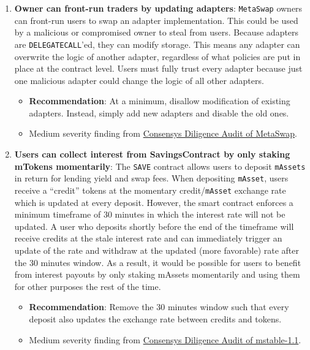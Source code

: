\begin{enumerate}
\item\textbf{Owner can front-run traders by updating adapters}: \verb|MetaSwap| owners can front-run users to swap an adapter implementation. This could be used by a malicious or compromised owner to steal from users. Because adapters are \verb|DELEGATECALL|’ed, they can modify storage. This means any adapter can overwrite the logic of another adapter, regardless of what policies are put in place at the contract level. Users must fully trust every adapter because just one malicious adapter could change the logic of all other adapters.
	\begin{itemize}
	\item\textbf{Recommendation}: At a minimum, disallow modification of existing adapters. Instead, simply add new adapters and disable the old ones.
	\item Medium severity finding from \href{https://consensys.net/diligence/audits/2020/08/metaswap/\#owner-can-front-run-traders-by-updating-adapters}{Consensys Diligence Audit of MetaSwap}.
	\end{itemize}

\item\textbf{Users can collect interest from SavingsContract by only staking mTokens momentarily}: The \verb|SAVE| contract allows users to deposit \verb|mAssets| in return for lending yield and swap fees. When depositing \verb|mAsset|, users receive a “credit” tokens at the momentary credit/\verb|mAsset| exchange rate which is updated at every deposit. However, the smart contract enforces a minimum timeframe of 30 minutes in which the interest rate will not be updated. A user who deposits shortly before the end of the timeframe will receive credits at the stale interest rate and can immediately trigger an update of the rate and withdraw at the updated (more favorable) rate after the 30 minutes window. As a result, it would be possible for users to benefit from interest payouts by only staking mAssets momentarily and using them for other purposes the rest of the time.
	\begin{itemize}
	\item\textbf{Recommendation}: Remove the 30 minutes window such that every deposit also updates the exchange rate between credits and tokens.
	\item Medium severity finding from \href{https://consensys.net/diligence/audits/2020/07/mstable-1.1/\#users-can-collect-interest-from-savingscontract-by-only-staking-mtokens-momentarily}{Consensys Diligence Audit of mstable-1.1}.
	\end{itemize}


\end{enumerate}
